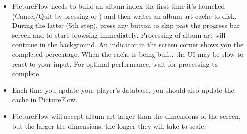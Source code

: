   \begin{itemize}
    \item PictureFlow needs to build an album index the first time it's launched
    (Cancel/Quit by pressing \ActionStdCancel{} or \ActionStdMenu{}) and then writes an album art cache to disk.
    During the latter (5th step), press any button to skip past the progress bar screen and
    to start browsing immediately. Processing of album art will continue in the
    background. An indicator in the screen corner shows you the completed percentage.
    When the cache is being built, the UI may be slow to react to your input.
    For optimal performance, wait for processing to complete.
    \item Each time you update your player's database, you should also update the cache
    in PictureFlow.
    \item PictureFlow will accept album art larger than the dimensions of the
    screen, but the larger the dimensions, the longer they will take to scale.
  \end{itemize}

